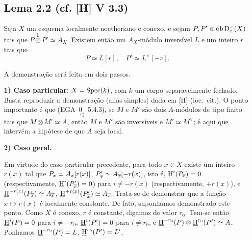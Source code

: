 \subsection*{Lema 2.2 (cf. [H] V 3.3)}
Seja $X$ um esquema localmente noetheriano e conexo, e sejam $P, P' \in \operatorname{ob} \mathrm{D}_c^{-}(X)$ tais que $P \mathop{\otimes}\limits^{\mathrm{L}} P' \simeq A_X$. Existem então um $A_X$-módulo inversível $L$ e um inteiro $r$ tais que
\[
P \simeq L[r], \quad P' \simeq L^{\vee}[-r].
\]

A demonstração será feita em dois passos.

\textbf{1) Caso particular:} $X = \operatorname{Spec}(k)$, com $k$ um corpo separavelmente fechado. Basta reproduzir a demonstração (aliás simples) dada em [H] (loc.~cit.). O ponto importante é que (EGA~$\underline{\underline 0}_{\mathrm{I}}$~5.4.3), se $M$ e $M'$ são dois $A$-módulos de tipo finito tais que $M \otimes M' \simeq A$, então $M$ e $M'$ são inversíveis e $M' \simeq M^{\vee}$; é aqui que intervém a hipótese de que $A$ seja local.

\textbf{2) Caso geral.}

Em virtude do caso particular precedente, para todo $x \in X$ existe um inteiro $r(x)$ tal que $P_{\overline{x}} \simeq A_{\overline{x}}[r(x)]$, $P'_{\overline{x}} \simeq A_{\overline{x}}[-r(x)]$, isto é, $\underline{\mathrm H}^i(P_{\overline{x}}) = 0$ (respectivamente, $\underline{\mathrm H}^i(P'_{\overline{x}}) = 0$) para $i \neq -r(x)$ (respectivamente, $+r(x)$), e $\underline{\mathrm H}^{-r(x)}(P_{\overline{x}}) \simeq A_{\overline{x}}$, $\underline{\mathrm H}^{+r(x)}(P'_{\overline{x}}) \simeq A_{\overline{x}}$. Trata-se de demonstrar que a função $x \mapsto r(x)$ é localmente constante. De fato, suponhamos demonstrado este ponto. Como $X$ é conexo, $r$ é constante, digamos de valor $r_0$. Tem-se então $\underline{\mathrm H}^i(P) = 0$ para $i \neq -r_0$, $\underline{\mathrm H}^i(P') = 0$ para $i \neq r_0$, e $\underline{\mathrm H}^{-r_0}(P) \otimes \underline{\mathrm H}^{r_0}(P') \simeq A$. Ponhamos $\underline{\mathrm H}^{-r_0}(P) = L$, $\underline{\mathrm H}^{r_0}(P') = L'$.

